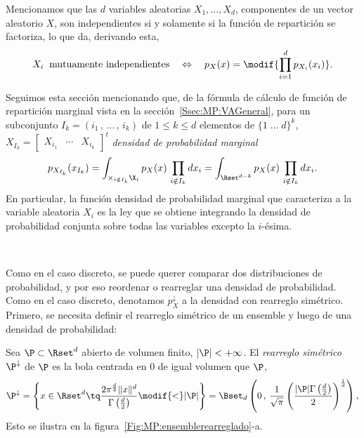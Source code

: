 Mencionamos que las $d$ variables  aleatorias $X_1, \ldots, X_d$, componentes de
un vector  aleatorio $X$, son independientes  si y solamente si  la funci\'on de
repartici\'on se factoriza, lo que da, derivando esta,
%
\[
X_i \:  \mbox{ mutuamente independientes} \quad \Leftrightarrow  \quad p_X(x) =
\modif{\prod_{i=1}^d p_{X_i}(x_i)}.
\]


Seguimos  esta  secci\'on mencionando  que,  de  la  f\'ormula de  c\'alculo  de
funci\'on       de      repartici\'on       marginal      vista       en      la
secci\'on~\ref{Ssec:MP:VAGeneral},  para un  subconjunto  $I_k =  (i_1  \, ,  \,
\ldots \, , \, i_k)$ de $1 \le k \le d$ elementos de $\{ 1 \; \ldots \; d \}^k$,
$X_{I_k}   =  \begin{bmatrix}   X_{i_1}  &   \cdots   &  X_{i_k}\end{bmatrix}^t$
 {\it densidad de probabilidad marginal}
%
\[
p_{X_{I_k}}(x_{I_k})  = \int_{\times_{i  \notin  I_k} \X_i}  p_X(x) \,  \prod_{i
    \notin I_k}  dx_i =  \int_{\Rset^{d-k}} p_X(x) \,  \prod_{i \notin
      I_k} dx_i.
\]
%
En particular, la funci\'on densidad  de probabilidad marginal que caracteriza a
la variable aleatoria  $X_i$ es la ley que se obtiene  integrando la densidad de
probabilidad conjunta sobre todas las variables excepto la $i$-\'esima.

\

Como  en  el caso  discreto,  se puede  querer  comparar  dos distribuciones  de
probabilidad, y  por eso  reordenar o rearreglar  una densidad  de probabilidad.
Como en el caso discreto, denotamos $p_X^\downarrow$ a la densidad con rearreglo
sim\'etrico.   Primero,  se necesita  definir  el  rearreglo  sim\'etrico de  un
ensemble y luego de una densidad de probabilidad:
%
\begin{definicion}
\label{Def:MP:RearregloConjunto}
%
  Sea $\P \subset \Rset^d$ abierto de  volumen finito, $|\P| < +\infty$.  El {\it
    rearreglo sim\'etrico} $\P^\downarrow$  de $\P$ es la bola  centrada en 0 de
 igual volumen que $\P$, \ie
  \[
  \P^\downarrow  =   \left\{  x   \in  \Rset^d  \tq   \frac{2  \pi^{\frac{d}{2}}
      \|x\|^d}{\Gamma\left(\frac{d}{2}\right)} \modif{<} |\P| \right\} = \Bset_d\left(
    0  \,  , \,  \frac1{\sqrt{\pi}}  \left(  \frac{|\P| \Gamma\left(  \frac{d}{2}
        \right)}{2} \right)^{\frac1d} \right),
  \]
  Esto se ilustra en la figura~\ref{Fig:MP:ensemblerearreglado}-a.
\end{definicion}


